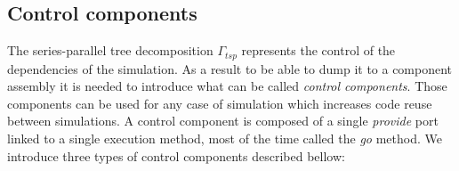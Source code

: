 
\subsection{Control components}
The series-parallel tree decomposition $\Gamma_{tsp}$ represents the control of the dependencies of the simulation. As a result to be able to dump it to a component assembly it is needed to introduce what can be called \emph{control components}. Those components can be used for any case of simulation which increases code reuse between simulations. A control component is composed of a single \emph{provide} port linked to a single execution method, most of the time called the \emph{go} method. We introduce three types of control components described bellow:

